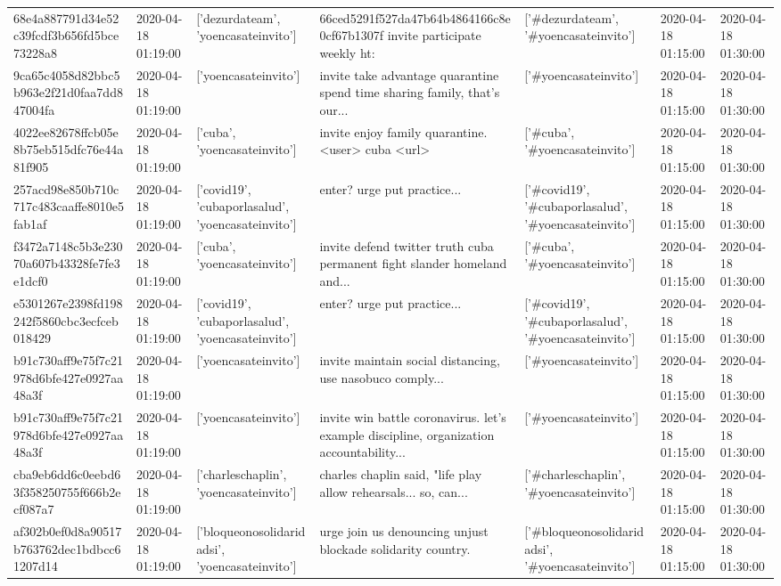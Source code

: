 \begin{tabular}{lllllll}
68e4a887791d34e52c39fcdf3b656fd5bce73228a8 & 2020-04-18 01:19:00 & ['dezurdateam', 'yoencasateinvito'] & 66ced5291f527da47b64b4864166c8e0cf67b1307f invite participate weekly ht: & ['#dezurdateam', '#yoencasateinvito'] & 2020-04-18 01:15:00 & 2020-04-18 01:30:00 \\
9ca65c4058d82bbc5b963e2f21d0faa7dd847004fa & 2020-04-18 01:19:00 & ['yoencasateinvito'] & invite take advantage quarantine spend time sharing family, that's our... & ['#yoencasateinvito'] & 2020-04-18 01:15:00 & 2020-04-18 01:30:00 \\
4022ee82678ffcb05e8b75eb515dfc76e44a81f905 & 2020-04-18 01:19:00 & ['cuba', 'yoencasateinvito'] & invite enjoy family quarantine. <user> cuba <url> & ['#cuba', '#yoencasateinvito'] & 2020-04-18 01:15:00 & 2020-04-18 01:30:00 \\
257acd98e850b710c717c483caaffe8010e5fab1af & 2020-04-18 01:19:00 & ['covid19', 'cubaporlasalud', 'yoencasateinvito'] & enter? urge put practice... & ['#covid19', '#cubaporlasalud', '#yoencasateinvito'] & 2020-04-18 01:15:00 & 2020-04-18 01:30:00 \\
f3472a7148c5b3e23070a607b43328fe7fe3e1dcf0 & 2020-04-18 01:19:00 & ['cuba', 'yoencasateinvito'] & invite defend twitter truth cuba permanent fight slander homeland and... & ['#cuba', '#yoencasateinvito'] & 2020-04-18 01:15:00 & 2020-04-18 01:30:00 \\
e5301267e2398fd198242f5860cbc3ecfceb018429 & 2020-04-18 01:19:00 & ['covid19', 'cubaporlasalud', 'yoencasateinvito'] & enter? urge put practice... & ['#covid19', '#cubaporlasalud', '#yoencasateinvito'] & 2020-04-18 01:15:00 & 2020-04-18 01:30:00 \\
b91c730aff9e75f7c21978d6bfe427e0927aa48a3f & 2020-04-18 01:19:00 & ['yoencasateinvito'] & invite maintain social distancing, use nasobuco comply... & ['#yoencasateinvito'] & 2020-04-18 01:15:00 & 2020-04-18 01:30:00 \\
b91c730aff9e75f7c21978d6bfe427e0927aa48a3f & 2020-04-18 01:19:00 & ['yoencasateinvito'] & invite win battle coronavirus. let's example discipline, organization accountability... & ['#yoencasateinvito'] & 2020-04-18 01:15:00 & 2020-04-18 01:30:00 \\
cba9eb6dd6c0eebd63f358250755f666b2ecf087a7 & 2020-04-18 01:19:00 & ['charleschaplin', 'yoencasateinvito'] & charles chaplin said, "life play allow rehearsals... so, can... & ['#charleschaplin', '#yoencasateinvito'] & 2020-04-18 01:15:00 & 2020-04-18 01:30:00 \\
af302b0ef0d8a90517b763762dec1bdbcc61207d14 & 2020-04-18 01:19:00 & ['bloqueonosolidaridadsi', 'yoencasateinvito'] & urge join us denouncing unjust blockade solidarity country. & ['#bloqueonosolidaridadsi', '#yoencasateinvito'] & 2020-04-18 01:15:00 & 2020-04-18 01:30:00 \\

\end{tabular}

